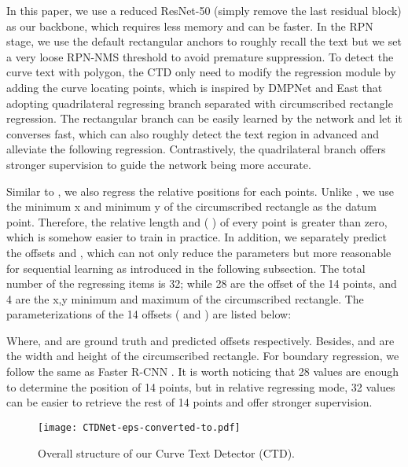 \documentclass[10pt,twocolumn,letterpaper]{article}
\begin{document}
In this paper, we use a reduced ResNet-50 (simply remove the last residual block) as our backbone, which requires less memory and can be faster. In the RPN stage, we use the default rectangular anchors to roughly recall the text but we set a very loose RPN-NMS threshold to avoid premature suppression.
To detect the curve text with polygon, the CTD only need to modify the regression module by adding the curve locating points, which is inspired by DMPNet \cite{liu2017deep} and East \cite{zhou2017east} that adopting quadrilateral regressing branch separated with circumscribed rectangle regression. The rectangular branch can be easily learned by the network and let it converses fast, which can also roughly detect the text region in advanced and alleviate the following regression. Contrastively, the quadrilateral branch offers stronger supervision to guide the network being more accurate.

Similar to \cite{ren2015faster,liu2017deep}, we also regress the relative positions for each points. Unlike \cite{liu2017deep}, we use the minimum x and minimum y of the circumscribed rectangle as the datum point. Therefore, the relative length  and  (  ) of every point is greater than zero, which is somehow easier to train in practice. In addition, we separately predict the offsets  and , which can not only reduce the parameters but more reasonable for sequential learning as introduced in the following subsection.
The total number of the regressing items is 32; while 28 are the offset of the 14 points, and 4 are the x,y minimum and maximum of the circumscribed rectangle. The parameterizations of the 14 offsets ( and ) are listed below:

Where,  and  are ground truth and predicted offsets respectively. Besides,  and  are the width and height of the circumscribed rectangle. For boundary regression, we follow the same as Faster R-CNN \cite{ren2015faster}. It is worth noticing that 28 values are enough to determine the position of 14 points, but in relative regressing mode, 32 values can be easier to retrieve the rest of 14 points and offer stronger supervision.
\begin{figure*}[htb]
  \centering
  \centerline{\texttt{[image: CTDNet-eps-converted-to.pdf]}} \caption{Overall structure of our Curve Text Detector (CTD).  }\label{fig:net}
\end{figure*}
\end{document}
